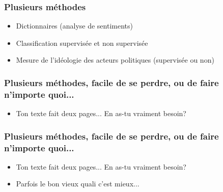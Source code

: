 \documentclass{beamer}
\begin{document}
\begin{frame}
      
      \frametitle{Plusieurs méthodes} \vspace{1cm}
      
           \begin{itemize}
           
           \item Dictionnaires (analyse de sentiments)
           
           \item Classification supervisée et non supervisée
           
           \item Mesure de l'idéologie des acteurs politiques (supervisée ou non)
           
      \end{itemize}
           
 \end{frame}
     

 \begin{frame}
      
      \frametitle{Plusieurs méthodes, facile de se perdre, ou de faire n'importe quoi...} \vspace{1cm}
 
           \begin{itemize}
 
                \item Ton texte fait deux pages... En as-tu vraiment besoin?
 
        \end{itemize}
 
 \end{frame}


 \begin{frame}
      
      \frametitle{Plusieurs méthodes, facile de se perdre, ou de faire n'importe quoi...} \vspace{1cm}
 
           \begin{itemize}
 
                \item Ton texte fait deux pages... En as-tu vraiment besoin?
      
                 \item Parfois le bon vieux quali c'est mieux...
 
        \end{itemize}
 
 \end{frame}
\end{document}
